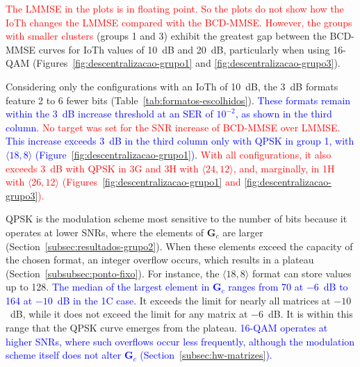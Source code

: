 \textcolor{red}{The LMMSE in the plots is in floating point. So the plots do not show how the IoTh changes the LMMSE compared with the BCD-MMSE. However, the groups with smaller clusters} (groups 1 and 3) exhibit the greatest gap between the BCD-MMSE curves for IoTh values of 10~dB and 20~dB, particularly when using 16-QAM (Figures~\ref{fig:descentralizacao-grupo1} and \ref{fig:descentralizacao-grupo3}).

Considering only the configurations with an IoTh of 10~dB, the 3~dB formats feature 2 to 6 fewer bits (Table~\ref{tab:formatos-escolhidos}). \textcolor{blue}{These formats remain within the 3~dB increase threshold at an $\mathrm{SER}$ of $10^{-2}$, as shown in the third column.} \textcolor{red}{No target was set for the SNR increase of BCD-MMSE over LMMSE. }\textcolor{blue}{This increase exceeds 3~dB in the third column only with QPSK in group 1, with $\langle 18,8\rangle$ (Figure~\ref{fig:descentralizacao-grupo1}).} \textcolor{red}{With all configurations, it also exceeds 3~dB with QPSK in 3G and 3H with $\langle 24,12\rangle$, and, marginally, in 1H with $\langle 26,12\rangle$ (Figures~\ref{fig:descentralizacao-grupo1} and \ref{fig:descentralizacao-grupo3}).} 

QPSK is the modulation scheme most sensitive to the number of bits because it operates at lower SNRs, where the elements of $\mathbf G_c$ are larger (Section~\ref{subsec:resultados-grupo2}). When these elements exceed the capacity of the chosen format, an integer overflow occurs, which results in a plateau (Section~\ref{subsubsec:ponto-fixo}). For instance, the $\langle 18,8\rangle$ format can store values up to 128. \textcolor{blue}{The median of the largest element in $\mathbf G_c$ ranges from 70 at $-6$~dB to 164 at $-10$~dB in the 1C case.} It exceeds the limit for nearly all matrices at $-10$~dB, while it does not exceed the limit for any matrix at $-6$~dB. It is within this range that the QPSK curve emerges from the plateau. \textcolor{blue}{16-QAM operates at higher SNRs, where such overflows occur less frequently, although the modulation scheme itself does not alter $\mathbf G_c$ (Section~\ref{subsec:hw-matrizes}).}
